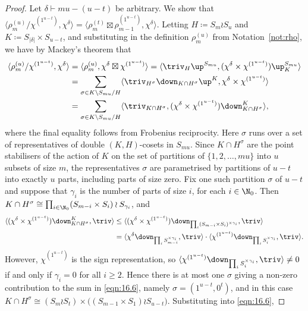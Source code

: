 \begin{proof}
	Let $\delta\vdash mu-(u-t)$ be arbitrary. We show that $\langle \rho^{(u)}_m/\chi^{(1^{u-t})}, \chi^\delta\rangle = \langle\rho^{(t)}_m\boxtimes \rho^{(1^{u-t})}_{m-1}, \chi^\delta\rangle$. 
	Letting $H\coloneqq S_m\wr S_u$ and $K\coloneqq S_{|\delta|}\times S_{u-t}$, and substituting in the definition $\rho^{(u)}_m$ from Notation~\ref{not:rho}, we have by Mackey's theorem that
	\begin{align}\label{eqn:16.6}
		\langle \rho^{(u)}_m/\chi^{(1^{u-t})}, \chi^\delta\rangle &= \langle \rho^{(u)}_m, \chi^\delta\boxtimes\chi^{(1^{u-t})}\rangle = \langle \triv_H\up^{S_{mu}}, (\chi^\delta\times\chi^{(1^{u-t})})\up_K^{S_{mu}}\rangle \nonumber\\
		&= \sum_{\sigma\in K\setminus S_{mu}/H}\langle\triv_{H^\sigma}\down_{K\cap H^\sigma}\up^K,\chi^\delta\times\chi^{(1^{u-t})}\rangle\nonumber\\
		&=\sum_{\sigma\in K\setminus S_{mu}/H}\langle\triv_{K\cap H^\sigma},(\chi^\delta\times\chi^{(1^{u-t})})\down^K_{K\cap H^\sigma}\rangle,
	\end{align}
	where the final equality follows from Frobenius reciprocity.
	Here $\sigma$ runs over a set of representatives of double $(K,H)$-cosets in $S_{mu}$. Since $K\cap H^\sigma$ are the point stabilisers of the action of $K$ on the set of partitions of $\{1,2,\dotsc,mu\}$ into $u$ subsets of size $m$, the representatives $\sigma$ are parametrised by partitions of $u-t$ into exactly $u$ parts, including parts of size zero. 
	Fix one such partition $\sigma$ of $u-t$ and suppose that $\gamma_i$ is the number of parts of size $i$, for each $i\in\N_0$. Then $K\cap H^\sigma \cong \prod_{i\in\N_0} (S_{m-i}\times S_i)\wr S_{\gamma_i}$, and
	\begin{align*}
		\langle (\chi^\delta\times\chi^{(1^{u-t})})\down^K_{K\cap H^\sigma}, \triv\rangle &\le \langle (\chi^\delta\times\chi^{(1^{u-t})})\down_{\prod_i (S_{m-i}\times S_i)^{\times \gamma_i}}, \triv\rangle\\
		&= \langle \chi^\delta\down_{\prod_i S_{m-i}^{\times\gamma_i}},\triv\rangle\cdot \langle \chi^{(1^{u-t})}\down_{\prod_i S_i^{\times\gamma_i}},\triv\rangle.
	\end{align*}
	However, $\chi^{(1^{u-t})}$ is the sign representation, so $\langle \chi^{(1^{u-t})}\down_{\prod_i S_i^{\times\gamma_i}},\triv\rangle\ne 0$ if and only if $\gamma_i=0$ for all $i\ge 2$. Hence there is at most one $\sigma$ giving a non-zero contribution to the sum in \eqref{eqn:16.6}, namely $\sigma=(1^{u-t},0^t)$, and in this case $K\cap H^\sigma\cong (S_m\wr S_t)\times \big((S_{m-1}\times S_1)\wr S_{u-t}\big)$. Substituting into \eqref{eqn:16.6},

\end{proof}
